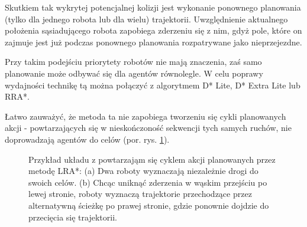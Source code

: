 
Skutkiem tak wykrytej potencjalnej kolizji jest wykonanie ponownego planowania (tylko dla jednego robota lub dla wielu) trajektorii. Uwzględnienie aktualnego położenia sąsiadującego robota zapobiega zderzeniu się z nim, gdyż pole, które on zajmuje jest już podczas ponownego planowania rozpatrywane jako nieprzejezdne.

Przy takim podejściu priorytety robotów nie mają znaczenia, zaś samo planowanie może odbywać się dla agentów równolegle.
W celu poprawy wydajności technikę tą można połączyć z algorytmem D* Lite, D* Extra Lite lub RRA*.

Łatwo zauważyć, że metoda ta nie zapobiega tworzeniu się cykli planowanych akcji - powtarzających się w nieskończoność sekwencji tych samych ruchów, nie doprowadzają agentów do celów (por. rys. \ref{fig:robopath-lra-cycle}).

\begin{figure}
	\centering
		\qquad
	\caption{Przykład układu z powtarzająm się cyklem akcji planowanych przez metodę LRA*:
	(a) Dwa roboty wyznaczają niezależnie drogi do swoich celów.
	(b) Chcąc uniknąć zderzenia w wąskim przejściu po lewej stronie, roboty wyznaczą trajektorie przechodzące przez alternatywną ścieżkę po prawej stronie, gdzie ponownie dojdzie do przecięcia się trajektorii.}
	\label{fig:robopath-lra-cycle}
\end{figure}


